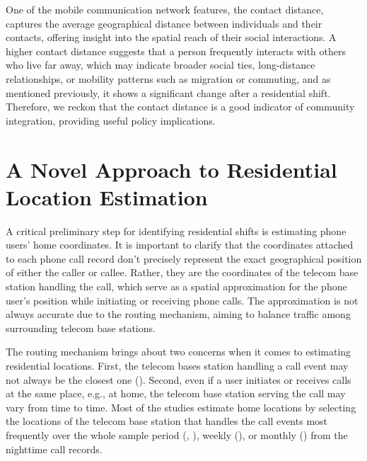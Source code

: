 One of the mobile communication network features, the contact distance, captures the average geographical distance between individuals and their contacts, offering insight into the spatial reach of their social interactions. A higher contact distance suggests that a person frequently interacts with others who live far away, which may indicate broader social ties, long-distance relationships, or mobility patterns such as migration or commuting, and as mentioned previously, it shows a significant change after a residential shift. Therefore, we reckon that the contact distance is a good indicator of community integration, providing useful policy implications.

\section{A Novel Approach to Residential Location Estimation}
A critical preliminary step for identifying residential shifts is estimating phone users' home coordinates. It is important to clarify that the coordinates attached to each phone call record don't precisely represent the exact geographical position of either the caller or callee. Rather, they are the coordinates of the telecom base station handling the call, which serve as a spatial approximation for the phone user's position while initiating or receiving phone calls. The approximation is not always accurate due to the routing mechanism, aiming to balance traffic among surrounding telecom base stations.


The routing mechanism brings about two concerns when it comes to estimating residential locations. First, the telecom bases station handling a call event may not always be the closest one (\cite{yuan2012correlating}). Second, even if a user initiates or receives calls at the same place, e.g., at home, the telecom base station serving the call may vary from time to time. Most of the studies estimate home locations by selecting the locations of the telecom base station that handles the call events most frequently over the whole sample period (\cite{cho2011friendship}, \cite{phithakkitnukoon2012socio}), weekly (\cite{referral_effect_2023aer}), or monthly (\cite{phithakkitnukoon2022inferring}) from the nighttime call records.


